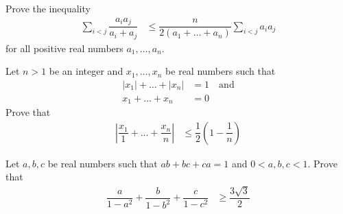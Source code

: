 \documentclass{subfile}
\begin{document}
		\begin{problem}
			Prove the inequality
				\begin{align*}
					\sum_{i<j}\dfrac{a_{i}a_{j}}{a_{i}+a_{j}}
						& \leq \dfrac{n}{2(a_{1}+\ldots+a_{n})}\sum_{i<j}a_{i}a_{j}
				\end{align*}
			for all positive real numbers $a_{1},\ldots,a_{n}$.
		\end{problem}
	
		\begin{problem}
			Let $n>1$ be an integer and $x_{1},\ldots,x_{n}$ be real numbers such that
				\begin{align*}
					|x_{1}|+\ldots+|x_{n}|
						& = 1\quad\mbox{and}\\
					x_{1}+\ldots+x_{n}
						& = 0
				\end{align*}
			Prove that
				\begin{align*}
					\left|\dfrac{x_{1}}{1}+\ldots+\dfrac{x_{n}}{n}\right|
						& \leq \dfrac{1}{2}\left(1-\dfrac{1}{n}\right)
				\end{align*}
		\end{problem}
	
		\begin{problem}
			Let $a,b,c$ be real numbers such that $ab+bc+ca=1$ and $0<a,b,c<1$. Prove that
				\begin{align*}
					\dfrac{a}{1-a^{2}}+\dfrac{b}{1-b^{2}}+\dfrac{c}{1-c^{2}}
						& \geq\dfrac{3\sqrt{3}}{2}
				\end{align*}
		\end{problem}
\end{document}
